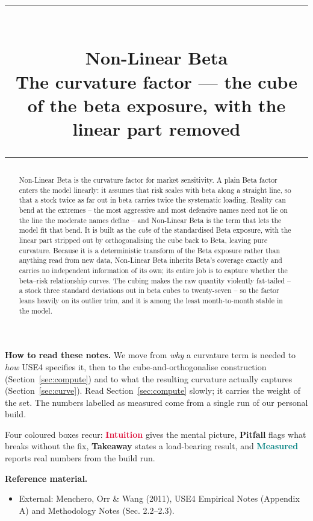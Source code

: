 \documentclass[11pt]{article}
\title{\vspace{-2.2em}
  {\color{steel}\rule{\textwidth}{1.3pt}}\\[0.7em]
  \Huge\bfseries Non-Linear Beta\\[0.35em]
  \large\mdseries The curvature factor --- the cube of the beta exposure, with the linear part removed\\[0.4em]
  {\color{steel}\rule{\textwidth}{0.7pt}}}
\author{}
\date{}
\theoremstyle{definition}
\theoremstyle{plain}
\theoremstyle{remark}
\begin{document}
\maketitle
\thispagestyle{empty}

\begin{abstract}
Non-Linear Beta is the curvature factor for market sensitivity. A plain Beta factor enters the model linearly: it assumes that risk scales with beta along a straight line, so that a stock twice as far out in beta carries twice the systematic loading. Reality can bend at the extremes -- the most aggressive and most defensive names need not lie on the line the moderate names define -- and Non-Linear Beta is the term that lets the model fit that bend. It is built as the \emph{cube} of the standardised Beta exposure, with the linear part stripped out by orthogonalising the cube back to Beta, leaving pure curvature. Because it is a deterministic transform of the Beta exposure rather than anything read from new data, Non-Linear Beta inherits Beta's coverage exactly and carries no independent information of its own; its entire job is to capture whether the beta--risk relationship curves. The cubing makes the raw quantity violently fat-tailed -- a stock three standard deviations out in beta cubes to twenty-seven -- so the factor leans heavily on its outlier trim, and it is among the least month-to-month stable in the model.
\end{abstract}

\begin{tcolorbox}[colback=paperlt,colframe=ink!30,boxrule=0.4pt,arc=2pt,left=10pt,right=10pt,top=8pt,bottom=8pt]
\textbf{How to read these notes.} We move from \emph{why} a curvature term is needed to \emph{how} USE4 specifies it, then to the cube-and-orthogonalise construction (Section~\ref{sec:compute}) and to what the resulting curvature actually captures (Section~\ref{sec:curve}). Read Section~\ref{sec:compute} slowly; it carries the weight of the set. The numbers labelled as measured come from a single run of our personal build.

\smallskip
Four coloured boxes recur: \textcolor{crimson}{\textbf{Intuition}} gives the mental picture, \textcolor{amber}{\textbf{Pitfall}} flags what breaks without the fix, \textcolor{steel}{\textbf{Takeaway}} states a load-bearing result, and \textcolor{teal}{\textbf{Measured}} reports real numbers from the build run.

\smallskip
\textbf{Reference material.}
\begin{itemize}[leftmargin=1.4em,topsep=2pt]
  \item External: Menchero, Orr \& Wang (2011), USE4 Empirical Notes (Appendix A) and Methodology Notes (Sec. 2.2--2.3).
\end{itemize}
\end{tcolorbox}
\end{document}
